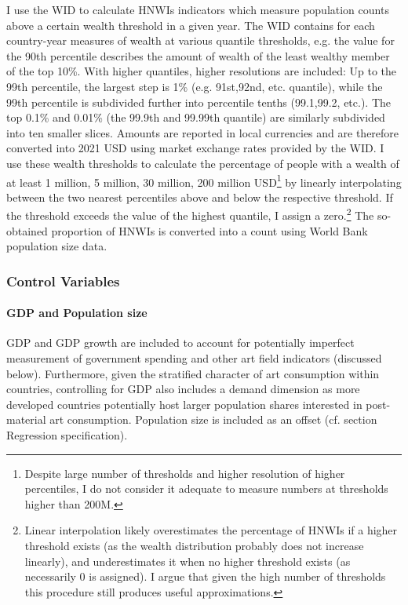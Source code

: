 \documentclass[11pt, authoryear]{elsarticle}
\begin{document}
I use the WID to calculate HNWIs indicators which measure population counts above a certain wealth threshold in a given year. 
The WID contains for each country-year measures of wealth at various quantile thresholds, e.g. the value for the 90th percentile describes the amount of wealth of the least wealthy member of the top 10\%.
With higher quantiles, higher resolutions are included: Up to the 99th percentile, the largest step is 1\% (e.g. 91st,92nd, etc. quantile), while the 99th percentile is subdivided further into percentile tenths (99.1,99.2, etc.).
The top 0.1\% and 0.01\% (the 99.9th and 99.99th quantile) are similarly subdivided into ten smaller slices.
Amounts are reported in local currencies and are therefore converted into 2021 USD using market exchange rates provided by the WID.
I use these wealth thresholds to calculate the percentage of people with a wealth of at least 1 million, 5 million, 30 million, 200 million USD\footnote{Despite large number of thresholds and higher resolution of higher percentiles, I do not consider it adequate to measure numbers at thresholds higher than 200M.} by linearly interpolating between the two nearest percentiles above and below the respective threshold.
If the threshold exceeds the value of the highest quantile, I assign a zero.\footnote{Linear interpolation likely overestimates the percentage of HNWIs if a higher threshold exists (as the wealth distribution probably does not increase linearly), and underestimates it when no higher threshold exists (as necessarily 0 is assigned). I argue that given the high number of thresholds this procedure still produces useful approximations.}
The so-obtained proportion of HNWIs is converted into a count using World Bank population size data.


\subsubsection*{Control Variables}

\paragraph*{GDP and Population size}

GDP and GDP growth are included to account for potentially imperfect measurement of government spending and other art field indicators (discussed below). 
Furthermore, given the stratified character of art consumption \citep{Bourdieu_1984_distinction} within countries, controlling for GDP also includes a demand dimension as more developed countries potentially host larger population shares interested in post-material art consumption.
Population size is included as an offset (cf. section Regression specification). 
\end{document}
